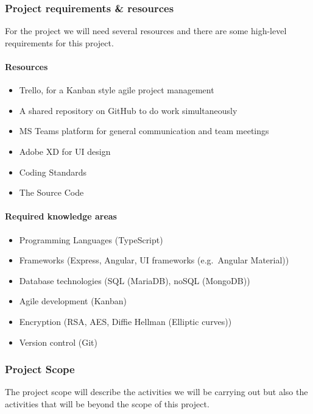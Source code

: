 \subsubsection{Project requirements \& resources}

For the project we will need several resources and there are some high-level requirements for this project.

\paragraph{Resources}
\begin{itemize}
    \item Trello, for a Kanban style agile project management
    \item A shared repository on GitHub to do work simultaneously
    \item MS Teams platform for general communication and team meetings
    \item Adobe XD for UI design
    \item Coding Standards
    \item The Source Code
\end{itemize}

\paragraph{Required knowledge areas}
\begin{itemize}
    \item Programming Languages (TypeScript)
    \item Frameworks (Express, Angular, UI frameworks (e.g.\ Angular Material))
    \item Database technologies (SQL (MariaDB), noSQL (MongoDB))
    \item Agile development (Kanban)
    \item Encryption (RSA, AES, Diffie Hellman (Elliptic curves))
    \item Version control (Git)
\end{itemize}

\subsubsection{Project Scope}

The project scope will describe the activities we will be carrying out but also the activities that will be beyond the
scope of this project.

